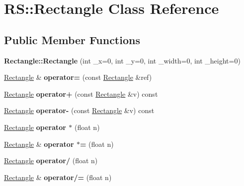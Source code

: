 \hypertarget{class_r_s_1_1_rectangle}{}\section{RS\+::Rectangle Class Reference}
\label{class_r_s_1_1_rectangle}
\subsection*{Public Member Functions}
\begin{DoxyCompactItemize}
\item 
\mbox{\label{class_r_s_1_1_rectangle_a53882b21673fb5c13169e705b5d3f5c2}} 
{\bfseries Rectangle\+::\+Rectangle} (int \+\_\+x=0, int \+\_\+y=0, int \+\_\+width=0, int \+\_\+height=0)
\item 
\mbox{\label{class_r_s_1_1_rectangle_a454413b842d316f6afac97971e3920a3}} 
\mbox{\hyperlink{class_r_s_1_1_rectangle}{Rectangle}} \& {\bfseries operator=} (const \mbox{\hyperlink{class_r_s_1_1_rectangle}{Rectangle}} \&ref)
\item 
\mbox{\label{class_r_s_1_1_rectangle_a39f8505dc9fec2c74c6a9332a4ffc1ee}} 
\mbox{\hyperlink{class_r_s_1_1_rectangle}{Rectangle}} {\bfseries operator+} (const \mbox{\hyperlink{class_r_s_1_1_rectangle}{Rectangle}} \&v) const
\item 
\mbox{\label{class_r_s_1_1_rectangle_a688e2489b498032576ddbecd90e1bd6f}} 
\mbox{\hyperlink{class_r_s_1_1_rectangle}{Rectangle}} {\bfseries operator-\/} (const \mbox{\hyperlink{class_r_s_1_1_rectangle}{Rectangle}} \&v) const
\item 
\mbox{\label{class_r_s_1_1_rectangle_ab1152cbfcee7b26a7114b1d3161651ad}} 
\mbox{\hyperlink{class_r_s_1_1_rectangle}{Rectangle}} {\bfseries operator $\ast$} (float n)
\item 
\mbox{\label{class_r_s_1_1_rectangle_ad7b49e37c96a62e01cd6314b48e61bc2}} 
\mbox{\hyperlink{class_r_s_1_1_rectangle}{Rectangle}} \& {\bfseries operator $\ast$=} (float n)
\item 
\mbox{\label{class_r_s_1_1_rectangle_ae377b8273ab3f5c6c71c9b848940503a}} 
\mbox{\hyperlink{class_r_s_1_1_rectangle}{Rectangle}} {\bfseries operator/} (float n)
\item 
\mbox{\label{class_r_s_1_1_rectangle_a48e8120afa88a163e08050276d7b5680}} 
\mbox{\hyperlink{class_r_s_1_1_rectangle}{Rectangle}} \& {\bfseries operator/=} (float n)
\end{DoxyCompactItemize}
